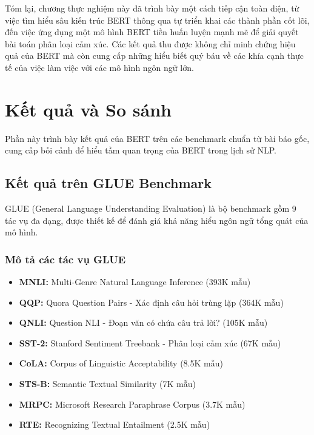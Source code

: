 Tóm lại, chương thực nghiệm này đã trình bày một cách tiếp cận toàn diện, từ việc tìm hiểu sâu kiến trúc BERT thông qua tự triển khai các thành phần cốt lõi, đến việc ứng dụng một mô hình BERT tiền huấn luyện mạnh mẽ để giải quyết bài toán phân loại cảm xúc. Các kết quả thu được không chỉ minh chứng hiệu quả của BERT mà còn cung cấp những hiểu biết quý báu về các khía cạnh thực tế của việc làm việc với các mô hình ngôn ngữ lớn.

\section{Kết quả và So sánh}
\label{sec:ket_qua_so_sanh}
Phần này trình bày kết quả của BERT trên các benchmark chuẩn từ bài báo gốc, cung cấp bối cảnh để hiểu tầm quan trọng của BERT trong lịch sử NLP.

\subsection{Kết quả trên GLUE Benchmark}
\label{ssec:ket_qua_glue}
GLUE (General Language Understanding Evaluation) là bộ benchmark gồm 9 tác vụ đa dạng, được thiết kế để đánh giá khả năng hiểu ngôn ngữ tổng quát của mô hình.

\subsubsection{Mô tả các tác vụ GLUE}
\begin{itemize}
    \item \textbf{MNLI:} Multi-Genre Natural Language Inference (393K mẫu)
    \item \textbf{QQP:} Quora Question Pairs - Xác định câu hỏi trùng lặp (364K mẫu)
    \item \textbf{QNLI:} Question NLI - Đoạn văn có chứa câu trả lời? (105K mẫu)
    \item \textbf{SST-2:} Stanford Sentiment Treebank - Phân loại cảm xúc (67K mẫu)
    \item \textbf{CoLA:} Corpus of Linguistic Acceptability (8.5K mẫu)
    \item \textbf{STS-B:} Semantic Textual Similarity (7K mẫu)
    \item \textbf{MRPC:} Microsoft Research Paraphrase Corpus (3.7K mẫu)
    \item \textbf{RTE:} Recognizing Textual Entailment (2.5K mẫu)
\end{itemize}

